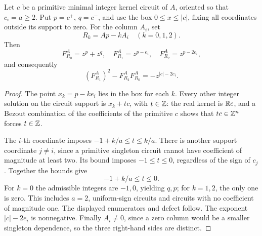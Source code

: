 \begin{lemma}\label{lem:positive-circuit}
Let \(c\) be a primitive minimal integer kernel circuit of \(A\), oriented so that \(c_i=a\ge2\). Put \(p=c^+\), \(q=c^-\), and use the box \(0\le x\le |c|\), fixing all coordinates outside its support to zero. For the column \(A_i\), set
\[
 R_k=Ap-kA_i\quad(k=0,1,2).
\]
Then
\[
 F^A_{R_0}=z^p+z^q,\quad
 F^A_{R_1}=z^{p-e_i},\quad
 F^A_{R_2}=z^{p-2e_i},
\]
and consequently
\begin{equation}\label{eq:negative-monomial}
 (F^A_{R_1})^2-F^A_{R_2}F^A_{R_0}
   =-z^{|c|-2e_i}.
\end{equation}
\end{lemma}
\begin{proof}
The point \(x_k=p-ke_i\) lies in the box for each \(k\). Every other integer solution on the circuit support is \(x_k+tc\), with \(t\in\mathbb Z\): the real kernel is \(\mathbb R c\), and a Bezout combination of the coefficients of the primitive \(c\) shows that \(tc\in\mathbb Z^n\) forces \(t\in\mathbb Z\).

The \(i\)-th coordinate imposes \(-1+k/a\le t\le k/a\). There is another support coordinate \(j\ne i\), since a primitive singleton circuit cannot have coefficient of magnitude at least two. Its bound imposes \(-1\le t\le0\), regardless of the sign of \(c_j\). Together the bounds give
\[
 -1+k/a\le t\le0.
\]
For \(k=0\) the admissible integers are \(-1,0\), yielding \(q,p\); for \(k=1,2\), the only one is zero. This includes \(a=2\), uniform-sign circuits and circuits with no coefficient of magnitude one. The displayed enumerators and defect follow. The exponent \(|c|-2e_i\) is nonnegative. Finally \(A_i\ne0\), since a zero column would be a smaller singleton dependence, so the three right-hand sides are distinct.
\end{proof}

